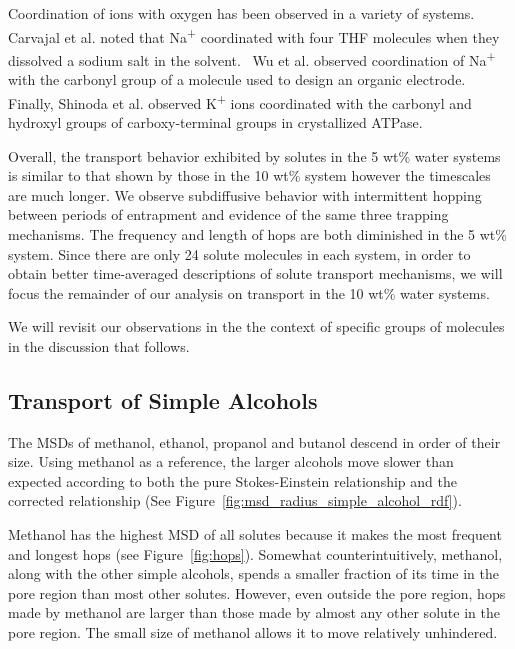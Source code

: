 \documentclass[journal=jpcbfk,manuscript=article]{achemso}
\begin{document}
  Coordination of ions with oxygen has been observed in a variety of systems. 
  Carvajal et al. noted that Na\textsuperscript{+} coordinated with four 
  THF molecules when they dissolved a sodium salt in the solvent.~\cite{carvajal_studies_1965}
  Wu et al. observed coordination of Na\textsuperscript{+} with the carbonyl
  group of a molecule used to design an organic electrode.~\cite{wu_unraveling_2015} 
  Finally, Shinoda et al. observed K\textsuperscript{+} ions coordinated with
  the carbonyl and hydroxyl groups of carboxy-terminal groups in crystallized
  ATPase.~\cite{shinoda_crystal_2009}
  
  Overall, the transport behavior exhibited by solutes in the 5 wt\% water
  systems is similar to that shown by those in the 10 wt\% system however
  the timescales are much longer. We observe subdiffusive behavior with 
  intermittent hopping between periods of entrapment and evidence
  of the same three trapping mechanisms. The frequency and 
  length of hops are both diminished in the 5 wt\% system. Since there are
  only 24 solute molecules in each system, in order to obtain better 
  time-averaged descriptions of solute transport mechanisms, we will focus
  the remainder of our analysis on transport in the 10 wt\% water systems.
  
  We will revisit our observations in the the context of specific groups of 
  molecules in the discussion that follows.
  
  \subsection{Transport of Simple Alcohols}

  The MSDs of methanol, ethanol, propanol and butanol descend in order of 
  their size. Using methanol as a reference, the larger alcohols move slower
  than expected according to both the pure Stokes-Einstein relationship 
  and the corrected relationship (See Figure~\ref{fig:msd_radius_simple_alcohol_rdf}).
  
  Methanol has the highest MSD of all solutes because it makes the most frequent
  and longest hops (see Figure~\ref{fig:hops}). Somewhat counterintuitively, 
  methanol, along with the other simple alcohols, spends a smaller fraction of its
  time in the pore region than most other solutes. However, even outside the pore
  region, hops made by methanol are larger than those made by almost any other solute
  in the pore region. The small size of methanol allows it to move relatively unhindered. 
\end{document}
